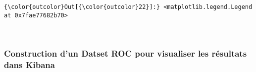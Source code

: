 \documentclass[11pt]{article}
\begin{document}
\begin{Verbatim}[commandchars=\\\{\}]
{\color{outcolor}Out[{\color{outcolor}22}]:} <matplotlib.legend.Legend at 0x7fae77682b70>
\end{Verbatim}
            
    \begin{center}
    \end{center}
    { \hspace*{\fill} \\}
    
    \hypertarget{construction-dun-datset-roc-pour-visualiser-les-ruxe9sultats-dans-kibana}{%
\subsubsection{Construction d'un Datset ROC pour visualiser les
résultats dans
Kibana}\label{construction-dun-datset-roc-pour-visualiser-les-ruxe9sultats-dans-kibana}}
\end{document}

